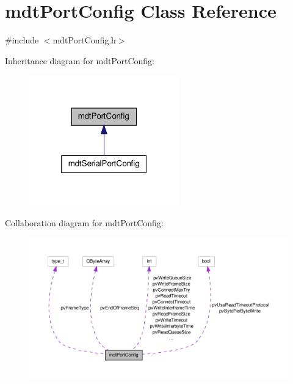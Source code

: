 \hypertarget{classmdt_port_config}{\section{mdt\-Port\-Config Class Reference}
\label{classmdt_port_config}
}


{\ttfamily \#include $<$mdt\-Port\-Config.\-h$>$}



Inheritance diagram for mdt\-Port\-Config\-:
\nopagebreak
\begin{figure}[H]
\begin{center}
\leavevmode
\includegraphics[width=184pt]{classmdt_port_config__inherit__graph}
\end{center}
\end{figure}


Collaboration diagram for mdt\-Port\-Config\-:
\nopagebreak
\begin{figure}[H]
\begin{center}
\leavevmode
\includegraphics[width=350pt]{classmdt_port_config__coll__graph}
\end{center}
\end{figure}
